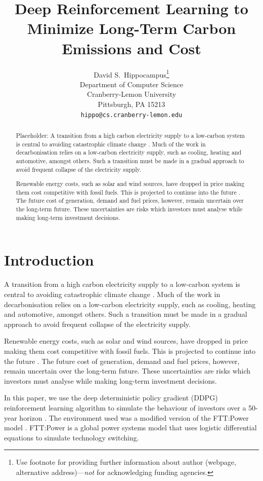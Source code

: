\documentclass{article}
\title{Deep Reinforcement Learning to Minimize Long-Term Carbon Emissions and Cost}
\author{%
  David S.~Hippocampus\thanks{Use footnote for providing further information
    about author (webpage, alternative address)---\emph{not} for acknowledging
    funding agencies.} \\
  Department of Computer Science\\
  Cranberry-Lemon University\\
  Pittsburgh, PA 15213 \\
  \texttt{hippo@cs.cranberry-lemon.edu} \\
}
\begin{document}
\maketitle

\begin{abstract}

{\color{red}Placeholder}: A transition from a high carbon electricity supply to a low-carbon system is central to avoiding catastrophic climate change \cite{Kell2020}. Much of the work in decarbonisation relies on a low-carbon electricity supply, such as cooling, heating and automotive, amongst others. Such a transition must be made in a gradual approach to avoid frequent collapse of the electricity supply.

Renewable energy costs, such as solar and wind sources, have dropped in price making them cost competitive with fossil fuels. This is projected to continue into the future \cite{IEA2015}. The future cost of generation, demand and fuel prices, however, remain uncertain over the long-term future. These uncertainties are risks which investors must analyse while making long-term investment decisions.

\end{abstract}




\section{Introduction}
\label{sec:intro}


A transition from a high carbon electricity supply to a low-carbon system is central to avoiding catastrophic climate change \cite{Kell2020}. Much of the work in decarbonisation relies on a low-carbon electricity supply, such as cooling, heating and automotive, amongst others. Such a transition must be made in a gradual approach to avoid frequent collapse of the electricity supply.

Renewable energy costs, such as solar and wind sources, have dropped in price making them cost competitive with fossil fuels. This is projected to continue into the future \cite{IEA2015}. The future cost of generation, demand and fuel prices, however, remain uncertain over the long-term future. These uncertainties are risks which investors must analyse while making long-term investment decisions.

In this paper, we use the deep deterministic policy gradient (DDPG) reinforcement learning algorithm to simulate the behaviour of investors over a 50-year horizon \cite{Hunt2016a}. The environment used was a modified version of the FTT:Power model \cite{Mercure2012}. FTT:Power is a global power systems model that uses logistic differential equations to simulate technology switching. 
\end{document}
